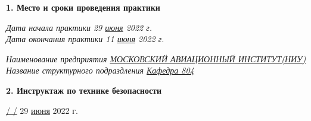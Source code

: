 \textbf{1. Место и сроки проведения практики}

\vspace{20pt}

{\em Дата начала практики \hspace{3cm} 29 \underline{июня} 2022 г.} \\

{\em Дата окончания практики \hspace{3cm} 11 \underline{июня} 2022 г.}

\vspace{20pt}

{\em Наименование предприятия \underline{МОСКОВСКИЙ АВИАЦИОННЫЙ ИНСТИТУТ(НИУ)}} \\

{\em Название структурного подраздления \underline{Кафедра 804}}

\vspace{20pt}

\textbf{2. Инструктаж по технике безопасности}

\vspace{10pt}

\underline{ \hspace{3cm} / \hspace{3cm} /} \hspace{1cm} 29 \underline{июня} 2022 г.
